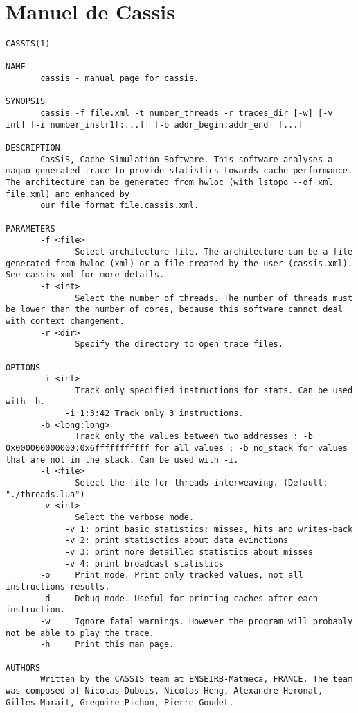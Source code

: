 \section{Manuel de Cassis}
\begin{lstlisting}[style=styleMan]
CASSIS(1)

NAME
       cassis - manual page for cassis.

SYNOPSIS
       cassis -f file.xml -t number_threads -r traces_dir [-w] [-v int] [-i number_instr1[:...]] [-b addr_begin:addr_end] [...]

DESCRIPTION
       CasSiS, Cache Simulation Software. This software analyses a maqao generated trace to provide statistics towards cache performance. The architecture can be generated from hwloc (with lstopo --of xml file.xml) and enhanced by
       our file format file.cassis.xml.

PARAMETERS
       -f <file>
              Select architecture file. The architecture can be a file generated from hwloc (xml) or a file created by the user (cassis.xml). See cassis-xml for more details.
       -t <int>
              Select the number of threads. The number of threads must be lower than the number of cores, because this software cannot deal with context changement.
       -r <dir>
              Specify the directory to open trace files.

OPTIONS
       -i <int>
              Track only specified instructions for stats. Can be used with -b.
            -i 1:3:42 Track only 3 instructions.
       -b <long:long>
              Track only the values between two addresses : -b 0x000000000000:0x6fffffffffff for all values ; -b no_stack for values that are not in the stack. Can be used with -i.
       -l <file>
              Select the file for threads interweaving. (Default: "./threads.lua")
       -v <int>
              Select the verbose mode.
            -v 1: print basic statistics: misses, hits and writes-back
            -v 2: print statisctics about data evinctions
            -v 3: print more detailled statistics about misses
            -v 4: print broadcast statistics
       -o     Print mode. Print only tracked values, not all instructions results.
       -d     Debug mode. Useful for printing caches after each instruction.
       -w     Ignore fatal warnings. However the program will probably not be able to play the trace.
       -h     Print this man page.

AUTHORS
       Written by the CASSIS team at ENSEIRB-Matmeca, FRANCE. The team was composed of Nicolas Dubois, Nicolas Heng, Alexandre Horonat, Gilles Marait, Gregoire Pichon, Pierre Goudet.


\end{lstlisting}
